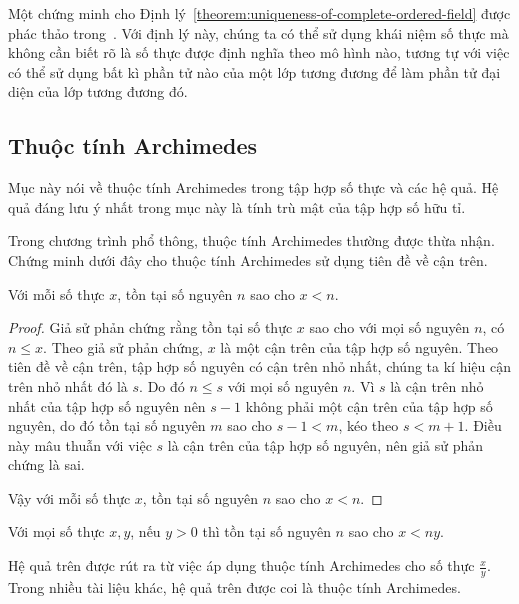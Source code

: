 Một chứng minh cho Định lý~\ref{theorem:uniqueness-of-complete-ordered-field} được phác thảo trong~\cite{spivak}. Với định lý này, chúng ta có thể sử dụng khái niệm số thực mà không cần biết rõ là số thực được định nghĩa theo mô hình nào, tương tự với việc có thể sử dụng bất kì phần tử nào của một lớp tương đương để làm phần tử đại diện của lớp tương đương đó.

\subsection{Thuộc tính Archimedes}

Mục này nói về thuộc tính Archimedes trong tập hợp số thực và các hệ quả. Hệ quả đáng lưu ý nhất trong mục này là tính trù mật của tập hợp số hữu tỉ.

Trong chương trình phổ thông, thuộc tính Archimedes thường được thừa nhận. Chứng minh dưới đây cho thuộc tính Archimedes sử dụng tiên đề về cận trên.

\begin{theorem}
    Với mỗi số thực $x$, tồn tại số nguyên $n$ sao cho $x < n$.
\end{theorem}

\begin{proof}
    Giả sử phản chứng rằng tồn tại số thực $x$ sao cho với mọi số nguyên $n$, có $n\leq x$. Theo giả sử phản chứng, $x$ là một cận trên của tập hợp số nguyên. Theo tiên đề về cận trên, tập hợp số nguyên có cận trên nhỏ nhất, chúng ta kí hiệu cận trên nhỏ nhất đó là $s$. Do đó $n\leq s$ với mọi số nguyên $n$. Vì $s$ là cận trên nhỏ nhất của tập hợp số nguyên nên $s - 1$ không phải một cận trên của tập hợp số nguyên, do đó tồn tại số nguyên $m$ sao cho $s - 1 < m$, kéo theo $s < m + 1$. Điều này mâu thuẫn với việc $s$ là cận trên của tập hợp số nguyên, nên giả sử phản chứng là sai.

    Vậy với mỗi số thực $x$, tồn tại số nguyên $n$ sao cho $x < n$.
\end{proof}

\begin{corollary}
    Với mọi số thực $x, y$, nếu $y > 0$ thì tồn tại số nguyên $n$ sao cho $x < ny$.
\end{corollary}

Hệ quả trên được rút ra từ việc áp dụng thuộc tính Archimedes cho số thực $\frac{x}{y}$. Trong nhiều tài liệu khác, hệ quả trên được coi là thuộc tính Archimedes.

